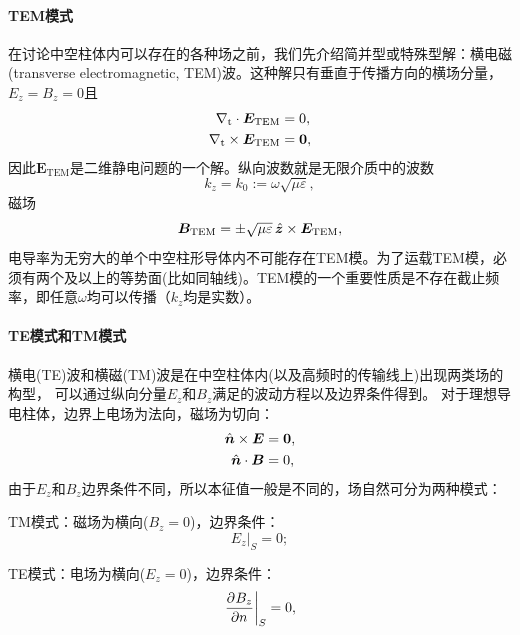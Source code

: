 \paragraph{TEM模式}

在讨论中空柱体内可以存在的各种场之前，我们先介绍简并型或特殊型解：横电磁(transverse electromagnetic, TEM)波。这种解只有垂直于传播方向的横场分量，$E_z=B_z=0$且
\begin{subequations}
    \begin{align}
        \nabla_\text t\cdot\bm E_\text{TEM}&=0,\\
        \nabla_\text t\times\bm E_\text{TEM}&=\bm 0,
    \end{align}
\end{subequations}
因此$\bm E_\text{TEM}$是二维静电问题的一个解。纵向波数就是无限介质中的波数
\begin{equation}
    \label{eqn:TEM k0}
    k_z=k_0:=\omega\sqrt{\mu\varepsilon},
\end{equation}
磁场 
\[
    \bm B_\text{TEM}=\pm\sqrt{\mu\varepsilon}\mathop{}\!\hat{\bm{z}}\times\bm E_\text{TEM},
\]
电导率为无穷大的单个中空柱形导体内不可能存在TEM模。为了运载TEM模，必须有两个及以上的等势面(比如同轴线)。TEM模的一个重要性质是不存在截止频率，即任意$\omega$均可以传播（$k_z$均是实数）。
\paragraph{TE模式和TM模式}
横电(TE)波和横磁(TM)波是在中空柱体内(以及高频时的传输线上)出现两类场的构型，
可以通过纵向分量$E_z$和$B_z$满足的波动方程以及边界条件得到。
对于理想导电柱体，边界上电场为法向，磁场为切向：
\begin{subequations}
    \begin{align}
        \mathop{}\!\hat{\bm{n}}\times\bm E&=\bm0,\\
        \mathop{}\!\hat{\bm{n}}\cdot\bm B&=0,
    \end{align}
\end{subequations}
由于$E_z$和$B_z$边界条件不同，所以本征值一般是不同的，场自然可分为两种模式：
\begin{compactitem}
	\item TM模式：磁场为横向($B_z=0$)，边界条件：
    \begin{equation}
        E_z|_S=0;
    \end{equation}
	\item TE模式：电场为横向($E_z=0$)，边界条件：
    \begin{equation}
        \left.\frac{\partial^{{}}B_z}{\partial{n}^{{}}}\right\rvert_S=0,
    \end{equation}
\end{compactitem}

